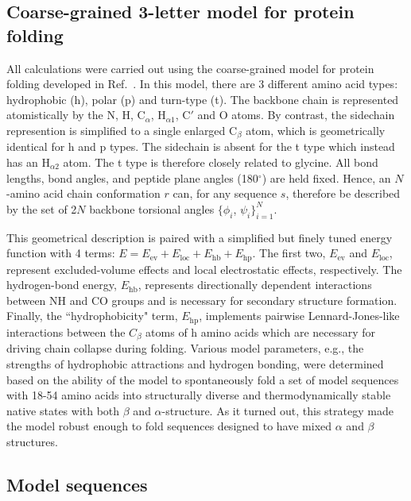 \documentclass[
aip,
rsi,%
amsmath,amssymb,
reprint,%
]{revtex4-1}
\newcommand	 {\sbar}	{{s}}
\newcommand	 {\rbar}	{{r}}
\begin{document}
\subsection{Coarse-grained 3-letter model for protein folding}

All calculations were carried out using the coarse-grained model for protein folding developed in Ref.~. In this model, there are 3 different amino acid types: hydrophobic (h), polar (p) and turn-type (t). The backbone chain is represented atomistically by the N, H, $\mathrm{C}_\alpha$, $\mathrm{H}_{\alpha 1}$, C$'$ and O atoms. By contrast, the sidechain represention is simplified to a single enlarged $\mathrm{C}_\beta$ atom, which is geometrically identical for h and p types. The sidechain is absent for the t type which instead has an $\mathrm{H}_{\alpha 2}$ atom. The t type is therefore closely related to glycine. All bond lengths, bond angles, and peptide plane angles (180$^\circ$) are held fixed. Hence, an $N$-amino acid chain conformation $\rbar$ can, for any sequence $\sbar$, therefore be described by the set of 2$N$ backbone torsional angles $\{\phi_i$, $\psi_i\}_{i=1}^{N}$. 
 
This geometrical description is paired with a simplified but finely tuned energy function with 4 terms: $E= E_\mathrm{ev} + E_\mathrm{loc} + E_\mathrm{hb} + E_\mathrm{hp}$. The first two, $E_\mathrm{ev}$ and $E_\mathrm{loc}$, represent excluded-volume effects and local electrostatic effects, respectively. The hydrogen-bond energy, $E_\mathrm{hb}$, represents directionally dependent interactions between NH and CO groups and is necessary for secondary structure formation. Finally, the ``hydrophobicity" term, $E_\mathrm{hp}$, implements pairwise Lennard-Jones-like interactions between the $C_\beta$ atoms of h amino acids which are necessary for driving chain collapse during folding. Various model parameters, e.g., the strengths of hydrophobic attractions and hydrogen bonding, were determined based on the ability of the model to spontaneously fold a set of model sequences with 18-54 amino acids into  structurally diverse and thermodynamically stable native states with both $\beta$ and $\alpha$-structure. As it turned out, this strategy made the model robust enough to fold sequences designed to have mixed $\alpha$ and $\beta$ structures. 

\subsection{Model sequences}
\end{document}
